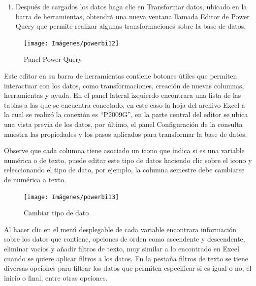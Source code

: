 \documentclass[
]{book}
\providecommand{\tightlist}{%
  \setlength{\itemsep}{0pt}\setlength{\parskip}{0pt}}
\begin{document}
\begin{enumerate}
\def\labelenumi{\arabic{enumi}.}
\setcounter{enumi}{3}
\tightlist
\item
  Después de cargados los datos haga clic en Transformar datos, ubicado en la barra de herramientas, obtendrá una nueva ventana llamada Editor de Power Query que permite realizar algunas transformaciones sobre la base de datos.
\end{enumerate}

\begin{figure}

{\centering \texttt{[image: Imágenes/powerbi12]} 

}

\caption{Panel Power Query}\label{fig:conexiondatos4-fig}
\end{figure}

Este editor en su barra de herramientas contiene botones útiles que permiten interactuar con los datos, como transformaciones, creación de nuevas columnas, herramientas y ayuda. En el panel lateral izquierdo encontrara una lista de las tablas a las que se encuentra conectado, en este caso la hoja del archivo Excel a la cual se realizó la conexión es ``P2009G'', en la parte central del editor se ubica una vista previa de los datos, por último, el panel Configuración de la consulta muestra las propiedades y los pasos aplicados para transformar la base de datos.

Observe que cada columna tiene asociado un icono que indica si es una variable numérica o de texto, puede editar este tipo de datos haciendo clic sobre el icono y seleccionando el tipo de dato, por ejemplo, la columna semestre debe cambiarse de numérica a texto.

\begin{figure}

{\centering \texttt{[image: Imágenes/powerbi13]} 

}

\caption{Cambiar tipo de dato}\label{fig:cambiartipodato-fig}
\end{figure}

Al hacer clic en el menú desplegable de cada variable encontrara información sobre los datos que contiene, opciones de orden como ascendente y descendente, eliminar vacíos y añadir filtros de texto, muy similar a lo encontrado en Excel cuando se quiere aplicar filtros a los datos. En la pestaña filtros de texto se tiene diversas opciones para filtrar los datos que permiten especificar si es igual o no, el inicio o final, entre otras opciones.
\end{document}
